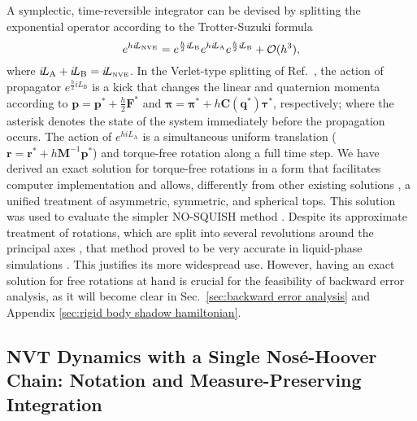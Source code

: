 \documentclass[
	aip,
	jcp,
	reprint,
]{revtex4-1}
\newcommand{\mt}[1]{\boldsymbol{\mathbf{#1}}}          %
\newcommand{\vt}[1]{\boldsymbol{\mathbf{#1}}}          %
\newcommand{\Liu}[1]{i\!L_\text{#1}}                   %
\newcommand{\timestep}{h}
\begin{document}
A symplectic, time-reversible integrator can be devised by splitting the exponential operator according to the Trotter-Suzuki formula \cite{Trotter_1959, Suzuki_1976}
\begin{equation}
\label{eq:splitting NVE}
e^{\timestep \Liu{\tiny NVE}} = e^{\frac{\timestep}{2} \Liu{B}} e^{\timestep \Liu{A}} e^{\frac{\timestep}{2} \Liu{B}} + \mathcal{O}(\timestep^3),
\end{equation}
where $\Liu{A} + \Liu{B} = \Liu{\tiny NVE}$.
In the Verlet-type splitting of Ref.~, the action of propagator $e^{\frac{\timestep}{2} \Liu{B}}$ is a kick that changes the linear and quaternion momenta according to ${\vt p} = {\vt p}^\ast + \frac{\timestep}{2} {\vt F}^\ast$ and ${\vt \pi} = {\vt \pi}^\ast + \timestep {\mt C}({\vt q^\ast}) {\vt \tau}^\ast$, respectively; where the asterisk denotes the state of the system immediately before the propagation occurs.
The action of $e^{\timestep \Liu{A}}$ is a simultaneous uniform translation (${\vt r} = {\vt r}^\ast + \timestep {\mt M}^{-1} {\vt p}^\ast$) and torque-free rotation along a full time step.
We have derived \cite{Silveira_2017} an exact solution for torque-free rotations in a form that facilitates computer implementation and allows, differently from other existing solutions \cite{Kosenko_1998, vanZon2007, Celledoni_2008}, a unified treatment of asymmetric, symmetric, and spherical tops.
This solution was used to evaluate the simpler NO-SQUISH method \cite{Miller_2002}.
Despite its approximate treatment of rotations, which are split into several revolutions around the principal axes \cite{Dullweber_1997}, that method proved to be very accurate in liquid-phase simulations \cite{Silveira_2017}.
This justifies its more widespread use.
However, having an exact solution for free rotations at hand is crucial for the feasibility of backward error analysis, as it will become clear in Sec.~\ref{sec:backward error analysis} and Appendix \ref{sec:rigid body shadow hamiltonian}.

\subsection{NVT Dynamics with a Single Nos\'{e}-Hoover Chain: Notation and Measure-Preserving Integration}
\label{sec:nvt}
\end{document}
